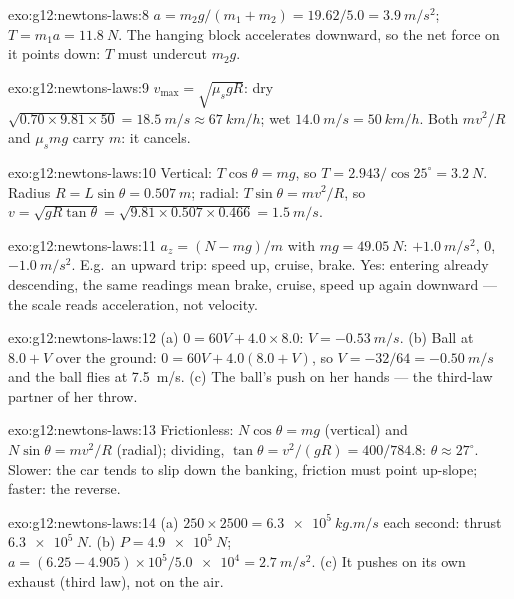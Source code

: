 \begin{solution}{exo:g12:newtons-laws:8}
$a = m_2 g/(m_1 + m_2) = 19.62/5.0 = \qty{3.9}{m/s^2}$;
$T = m_1 a = \qty{11.8}{N}$. The hanging block accelerates downward,
so the net force on it points down: $T$ must undercut $m_2 g$.
\end{solution}

\begin{solution}{exo:g12:newtons-laws:9}
$v_{\max} = \sqrt{\mu_s g R}$: dry
$\sqrt{0.70 \times 9.81 \times 50} = \qty{18.5}{m/s} \approx
\qty{67}{km/h}$; wet $\qty{14.0}{m/s} = \qty{50}{km/h}$. Both
$mv^2/R$ and $\mu_s mg$ carry $m$: it cancels.
\end{solution}

\begin{solution}{exo:g12:newtons-laws:10}
Vertical: $T\cos\theta = mg$, so
$T = 2.943/\cos 25^\circ = \qty{3.2}{N}$. Radius $R = L\sin\theta =
\qty{0.507}{m}$; radial: $T\sin\theta = mv^2/R$, so
$v = \sqrt{gR\tan\theta} = \sqrt{9.81 \times 0.507 \times 0.466}
= \qty{1.5}{m/s}$.
\end{solution}

\begin{solution}{exo:g12:newtons-laws:11}
$a_z = (N - mg)/m$ with $mg = \qty{49.05}{N}$: $+\qty{1.0}{m/s^2}$,
$0$, $-\qty{1.0}{m/s^2}$. E.g.\ an upward trip: speed up, cruise,
brake. Yes: entering already descending, the same readings mean brake,
cruise, speed up again downward --- the scale reads acceleration, not
velocity.
\end{solution}

\begin{solution}{exo:g12:newtons-laws:12}
(a) $0 = 60V + 4.0 \times 8.0$: $V = \qty{-0.53}{m/s}$.
(b) Ball at $8.0 + V$ over the ground: $0 = 60V + 4.0(8.0 + V)$, so
$V = -32/64 = \qty{-0.50}{m/s}$ and the ball flies at \qty{7.5}{m/s}.
(c) The ball's push on her hands --- the third-law partner of her
throw.
\end{solution}

\begin{solution}{exo:g12:newtons-laws:13}
Frictionless: $N\cos\theta = mg$ (vertical) and $N\sin\theta =
mv^2/R$ (radial); dividing, $\tan\theta = v^2/(gR) = 400/784.8$:
$\theta \approx 27^\circ$. Slower: the car tends to slip down the
banking, friction must point up-slope; faster: the reverse.
\end{solution}

\begin{solution}{exo:g12:newtons-laws:14}
(a) $250 \times 2500 = \qty{6.3e5}{kg.m/s}$ each second: thrust
$\qty{6.3e5}{N}$. (b) $P = \qty{4.9e5}{N}$;
$a = (6.25 - 4.905) \times 10^5 / \num{5.0e4} = \qty{2.7}{m/s^2}$.
(c) It pushes on its own exhaust (third law), not on the air.
\end{solution}


